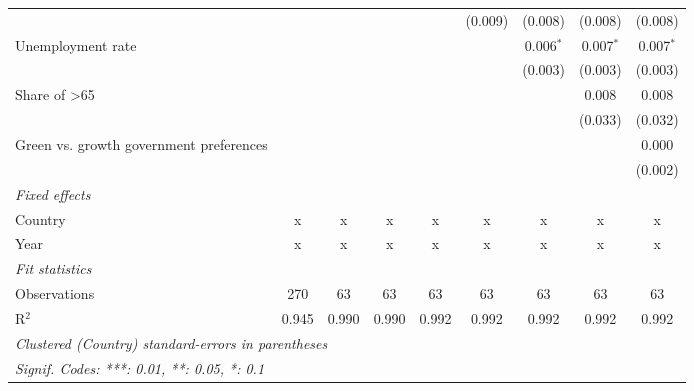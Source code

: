 \begin{table}[htbp]
\begin{tabular}{lcccccccc}
                                                                &         &         &         &             & (0.009)     & (0.008)     & (0.008)     & (0.008)\\   
      Unemployment rate                                         &         &         &         &             &             & 0.006$^{*}$ & 0.007$^{*}$ & 0.007$^{*}$\\   
                                                                &         &         &         &             &             & (0.003)     & (0.003)     & (0.003)\\   
      Share of >65                                              &         &         &         &             &             &             & 0.008       & 0.008\\   
                                                                &         &         &         &             &             &             & (0.033)     & (0.032)\\   
      Green vs. growth government preferences                   &         &         &         &             &             &             &             & 0.000\\   
                                                                &         &         &         &             &             &             &             & (0.002)\\   
      \emph{Fixed effects}\\
      Country                                                   & x       & x       & x       & x           & x           & x           & x           & x\\  
      Year                                                      & x       & x       & x       & x           & x           & x           & x           & x\\  
      \midrule \emph{Fit statistics}\\
      Observations                                              & 270     & 63      & 63      & 63          & 63          & 63          & 63          & 63\\  
      R$^2$                                                     & 0.945   & 0.990   & 0.990   & 0.992       & 0.992       & 0.992       & 0.992       & 0.992\\  
      \midrule
      \multicolumn{9}{l}{\emph{Clustered (Country) standard-errors in parentheses}}\\
      \multicolumn{9}{l}{\emph{Signif. Codes: ***: 0.01, **: 0.05, *: 0.1}}\\
   \end{tabular}
\end{table}


